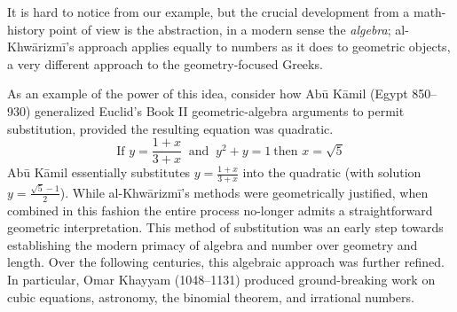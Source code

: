 It is hard to notice from our example, but the crucial development from a math-history point of view is the abstraction, in a modern sense the \emph{algebra}; al-Khwārizmī's approach applies equally to numbers as it does to geometric objects, a very different approach to the geometry-focused Greeks.\medbreak

As an example of the power of this idea, consider how Abū Kāmil (Egypt 850--930) generalized Euclid's Book II geometric-algebra arguments to permit substitution, provided the resulting equation was quadratic.
\[
	\text{If }y=\frac{1+x}{3+x}\ \text{ and }\ y^2+y=1\ \text{then }x=\sqrt 5
\]
Abū Kāmil essentially substitutes $y=\frac{1+x}{3+x}$ into the quadratic (with solution $y=\frac{\sqrt 5-1}2$). While al-Khwārizmī's methods were geometrically justified, when combined in this fashion the entire process no-longer admits a straightforward geometric interpretation. This method of substitution was an early step towards establishing the modern primacy of algebra and number over geometry and length.\smallbreak
Over the following centuries, this algebraic approach was further refined. In particular, Omar Khayyam (1048--1131) produced ground-breaking work on cubic equations, astronomy, the binomial theorem, and irrational numbers.


